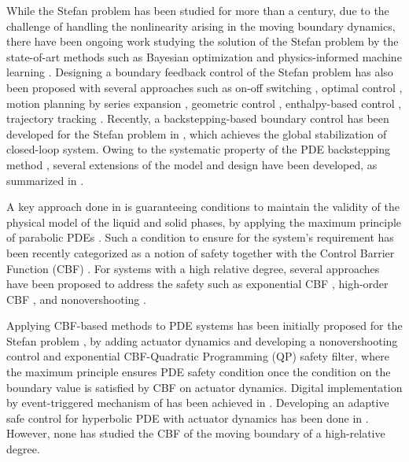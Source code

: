 \documentclass[letterpaper, 10 pt, conference]{cls/ieeeconf}
\theoremstyle{definition}
\begin{document}
While the Stefan problem has been studied for more than a century, due to the challenge of handling the nonlinearity arising in the moving boundary dynamics, there have been ongoing work studying the solution of the Stefan problem by the state-of-art methods such as Bayesian optimization \cite{winter2023multi} and physics-informed machine learning \cite{wang2021deep}. Designing a boundary feedback control of the Stefan problem has also been proposed with several approaches such as on-off switching \cite{Hoffman82}, optimal control \cite{Hinze07}, motion planning by series expansion \cite{dunbar2003boundary}, geometric control \cite{maidi2014}, enthalpy-based control \cite{petrus12}, trajectory tracking \cite{ecklebe2021toward}. Recently, a backstepping-based boundary control has been developed for the Stefan problem in \cite{Shumon19journal}, which achieves the global stabilization of closed-loop system. Owing to the systematic property of the PDE backstepping method \cite{PDEbook}, several extensions of the model and design have been developed, as summarized in \cite{KKbook2021}. 

A key approach done in \cite{Shumon19journal} is guaranteeing conditions to maintain the validity of the physical model of the liquid and solid phases, by applying the maximum principle of parabolic PDEs \cite{pao2012nonlinear}. Such a condition to ensure for the system's requirement has been recently categorized as a notion of safety together with the Control Barrier Function (CBF) \cite{ames2016control}. For systems with a high relative degree, several approaches have been proposed to address the safety such as exponential CBF \cite{nguyen2016exponential}, high-order CBF \cite{xiao2021high}, and nonovershooting \cite{krstic2006nonovershooting}. 


Applying CBF-based methods to PDE systems has been initially proposed for the Stefan problem \cite{koga2023safe}, by adding actuator dynamics and developing a nonovershooting control and exponential CBF-Quadratic Programming (QP) safety filter, where the maximum principle ensures PDE safety condition once the condition on the boundary value is satisfied by CBF on actuator dynamics. Digital implementation by event-triggered mechanism of \cite{koga2023safe} has been achieved in \cite{koga2023event}. Developing an adaptive safe control for hyperbolic PDE with actuator dynamics has been done in \cite{wang2024safe}. However, none has studied the CBF of the moving boundary of a high-relative degree. 
\end{document}
